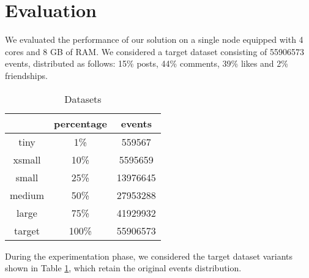 \section{Evaluation}
\label{sec:evaluation}

We evaluated the performance of our solution on a single node equipped with 4 cores and 8 GB of RAM. We considered a target dataset consisting of 55906573 events, distributed as follows: 15\% posts, 44\% comments, 39\% likes and 2\% friendships. 

\begin{table}[h!]
	\centering
	\caption{Datasets}
	\label{tab:datasets}
	\begin{tabular}{l|c|c|}
		\cline{2-3}
		& percentage & events  \\ \hline
		\multicolumn{1}{|c|}{tiny}		& 1\%	& 559567	\\ \hline
		\multicolumn{1}{|c|}{xsmall}	& 10\%	& 5595659	\\ \hline
		\multicolumn{1}{|c|}{small}		& 25\%	& 13976645	\\ \hline
		\multicolumn{1}{|c|}{medium}	& 50\%	& 27953288	\\ \hline
		\multicolumn{1}{|c|}{large}		& 75\%	& 41929932	\\ \hline
		\multicolumn{1}{|c|}{target}	& 100\%	& 55906573	\\ \hline
	\end{tabular}
\end{table}

During the experimentation phase, we considered the target dataset variants shown in Table \ref{tab:datasets}, which retain the original events distribution.